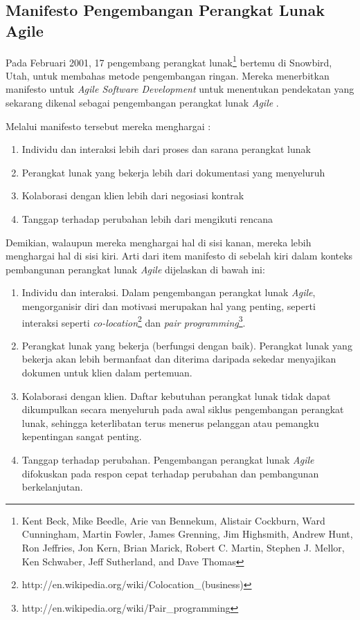 \documentclass[a4paper, 12pt, oneside]{report}
\begin{document}
\subsection{Manifesto Pengembangan Perangkat Lunak Agile}

\onehalfspacing Pada Februari 2001, 17 pengembang perangkat lunak\footnote{Kent Beck, Mike Beedle, Arie van Bennekum, Alistair Cockburn, Ward Cunningham, Martin Fowler, James Grenning, Jim Highsmith, Andrew Hunt, Ron Jeffries, Jon Kern, Brian Marick, Robert C. Martin, Stephen J. Mellor, Ken Schwaber, Jeff Sutherland, and Dave Thomas} bertemu di Snowbird, Utah, untuk membahas metode pengembangan ringan. Mereka menerbitkan manifesto untuk \textit{Agile Software Development} untuk menentukan pendekatan yang sekarang dikenal sebagai pengembangan perangkat lunak \textit{Agile} \cite{agile-wikipedia}.

\onehalfspacing Melalui manifesto tersebut mereka menghargai \cite{agile-manifesto}:
\begin{enumerate}
  \item Individu dan interaksi lebih dari proses dan sarana perangkat lunak
  \item Perangkat lunak yang bekerja lebih dari dokumentasi yang menyeluruh
  \item Kolaborasi dengan klien lebih dari negosiasi kontrak
  \item Tanggap terhadap perubahan lebih dari mengikuti rencana
\end{enumerate}

\onehalfspacing Demikian, walaupun mereka menghargai hal di sisi kanan, mereka lebih menghargai hal di sisi kiri. Arti dari item manifesto di sebelah kiri dalam konteks pembangunan perangkat lunak \textit{Agile} dijelaskan di bawah ini:

\begin{enumerate}
  \item Individu dan interaksi. Dalam pengembangan perangkat lunak \textit{Agile}, mengorganisir diri dan motivasi merupakan hal yang penting, seperti interaksi seperti \textit{co-location}\footnote{http://en.wikipedia.org/wiki/Colocation\_(business)} dan \textit{pair programming}\footnote{http://en.wikipedia.org/wiki/Pair\_programming}.
  \item Perangkat lunak yang bekerja (berfungsi dengan baik). Perangkat lunak yang bekerja akan lebih bermanfaat dan diterima daripada sekedar menyajikan dokumen untuk klien dalam pertemuan.
  \item Kolaborasi dengan klien. Daftar kebutuhan perangkat lunak tidak dapat \newline dikumpulkan secara menyeluruh pada awal siklus pengembangan perangkat lunak, sehingga keterlibatan terus menerus pelanggan atau pemangku kepentingan sangat penting.
  \item Tanggap terhadap perubahan. Pengembangan perangkat lunak \textit{Agile} difokuskan pada respon cepat terhadap perubahan dan pembangunan berkelanjutan.
\end{enumerate}
\end{document}
